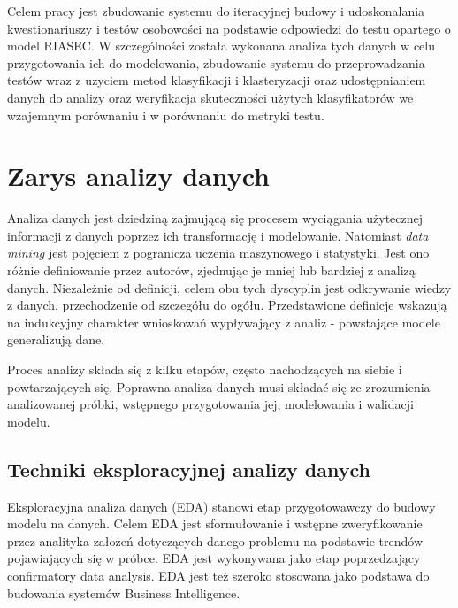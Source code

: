 \documentclass[12pt,a4paper,oneside]{report} %
\begin{document}
Celem pracy jest zbudowanie systemu do iteracyjnej budowy i udoskonalania kwestionariuszy i testów osobowości na podstawie odpowiedzi do testu opartego o model RIASEC. W szczególności została wykonana analiza tych danych w celu przygotowania ich do modelowania, zbudowanie systemu do przeprowadzania testów wraz z uzyciem metod klasyfikacji i klasteryzacji oraz udostępnianiem danych do analizy oraz weryfikacja skuteczności użytych klasyfikatorów we wzajemnym porównaniu i w porównaniu do metryki testu.\par










\chapter{Zarys analizy danych}

Analiza danych jest dziedziną zajmującą się procesem wyciągania użytecznej informacji z danych poprzez ich transformację i modelowanie. Natomiast \emph{data mining} jest pojęciem z pogranicza uczenia maszynowego i statystyki. Jest ono różnie definiowanie przez autorów, zjednując je mniej lub bardziej z analizą danych. Niezależnie od definicji, celem obu tych dyscyplin jest odkrywanie wiedzy z danych, przechodzenie od szczegółu do ogółu. Przedstawione definicje wskazują na indukcyjny charakter wnioskowań wypływający z analiz - powstające modele generalizują dane.

Proces analizy składa się z kilku etapów, często nachodzących na siebie i powtarzających się. Poprawna analiza danych musi składać się ze zrozumienia analizowanej próbki, wstępnego przygotowania jej, modelowania i walidacji modelu. 

\section{Techniki eksploracyjnej analizy danych}

Eksploracyjna analiza danych (EDA) stanowi etap przygotowawczy do budowy modelu na danych. Celem EDA jest sformułowanie i wstępne zweryfikowanie przez analityka założeń dotyczących danego problemu na podstawie trendów pojawiających się w próbce. EDA jest wykonywana jako etap poprzedzający confirmatory data analysis. EDA jest też szeroko stosowana jako podstawa do budowania systemów Business Intelligence.\cite{hseltman} \par 
\end{document}
